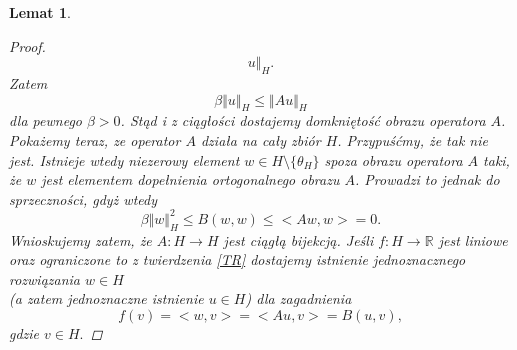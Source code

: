 \documentclass[12pt,a4paper,oneside,titlepage]{article}
\newtheorem{Lemat}{Lemat}
\begin{document}
\begin{Lemat}
\begin{proof}
\begin{equation}
 u \Vert_H . 
\end{equation}
Zatem
\begin{equation}
\nonumber
\beta \Vert u \Vert_H \leq \Vert Au \Vert_H 
\end{equation}
dla pewnego $\beta >0$. Stąd i z ciągłości dostajemy domkniętość obrazu operatora $A$. \\
\indent
Pokażemy teraz, ze operator $A$ działa na cały zbiór $H$. Przypuśćmy, że tak nie jest. Istnieje wtedy niezerowy element $w \in H \setminus \lbrace \theta_H \rbrace$ spoza obrazu operatora $A$  taki, że $w $ jest elementem dopełnienia ortogonalnego obrazu $A$. Prowadzi to jednak do sprzeczności, gdyż wtedy
\begin{equation}
\beta \Vert w \Vert_H^2 \leq B(w,w) \leq <Aw,w> = 0 .
\end{equation}
Wnioskujemy zatem, że $A:H \rightarrow H$ jest ciągłą bijekcją. Jeśli $f: H \rightarrow \mathbb{R}$ jest liniowe oraz ograniczone to z twierdzenia \ref{TR} dostajemy istnienie jednoznacznego rozwiązania $w \in H$ \\ (a zatem jednoznaczne istnienie $u \in H$) dla zagadnienia
\begin{equation}
f(v)  = <w,v>  = <Au,v> = B(u,v) ,
\end{equation}
gdzie $v \in H.$
\end{proof}
\end{Lemat}

\newpage
\end{document}
